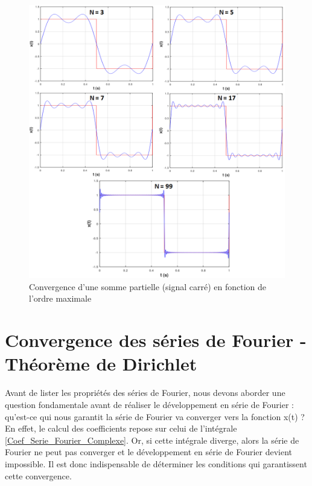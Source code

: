 	 
	\begin{figure}[h!]
	 	\centering
	 	\includegraphics[scale=0.5]{images/convergence_somme_partielle.png}
	 	\caption{Convergence d'une somme partielle (signal carré) en fonction de l'ordre maximale}	
	 	\label{Fig:somme_partielle} 
	\end{figure}
	 

	
	
	\vspace{1\baselineskip}
	
	
	\section{Convergence des séries de Fourier - Théorème de Dirichlet}
	Avant de lister les propriétés des séries de Fourier, nous devons aborder une question fondamentale avant de réaliser le développement en série de Fourier : qu'est-ce qui nous garantit la série de Fourier va converger vers la fonction x(t) ? En effet, le calcul des coefficients repose sur celui de l'intégrale \ref{Coef_Serie_Fourier_Complexe}. Or, si cette intégrale diverge, alors la série de Fourier ne peut pas converger et le développement en série de Fourier devient impossible. Il est donc indispensable de déterminer les conditions qui garantissent cette convergence.
	
